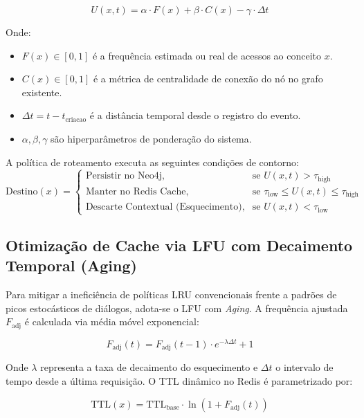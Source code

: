 \documentclass[11pt,a4paper]{article}
\begin{document}
\begin{equation}
U(x, t) = \alpha \cdot F(x) + \beta \cdot C(x) - \gamma \cdot \Delta t
\end{equation}

Onde:
\begin{itemize}
    \item $F(x) \in [0, 1]$ é a frequência estimada ou real de acessos ao conceito $x$.
    \item $C(x) \in [0, 1]$ é a métrica de centralidade de conexão do nó no grafo existente.
    \item $\Delta t = t - t_{\text{criacao}}$ é a distância temporal desde o registro do evento.
    \item $\alpha, \beta, \gamma$ são hiperparâmetros de ponderação do sistema.
\end{itemize}

A política de roteamento executa as seguintes condições de contorno:
\begin{equation}
\text{Destino}(x) = 
\begin{cases} 
\text{Persistir no Neo4j}, & \text{se } U(x, t) > \tau_{\text{high}} \\
\text{Manter no Redis Cache}, & \text{se } \tau_{\text{low}} \le U(x, t) \le \tau_{\text{high}} \\
\text{Descarte Contextual (Esquecimento)}, & \text{se } U(x, t) < \tau_{\text{low}}
\end{cases}
\end{equation}

\subsection{Otimização de Cache via LFU com Decaimento Temporal (Aging)}
Para mitigar a ineficiência de políticas LRU convencionais frente a padrões de picos estocásticos de diálogos, adota-se o LFU com \textit{Aging}. A frequência ajustada $F_{\text{adj}}$ é calculada via média móvel exponencial:

\begin{equation}
F_{\text{adj}}(t) = F_{\text{adj}}(t-1) \cdot e^{-\lambda \Delta t} + 1
\end{equation}

Onde $\lambda$ representa a taxa de decaimento do esquecimento e $\Delta t$ o intervalo de tempo desde a última requisição. O TTL dinâmico no Redis é parametrizado por:

\begin{equation}
\text{TTL}(x) = \text{TTL}_{\text{base}} \cdot \ln(1 + F_{\text{adj}}(t))
\end{equation}
\end{document}
